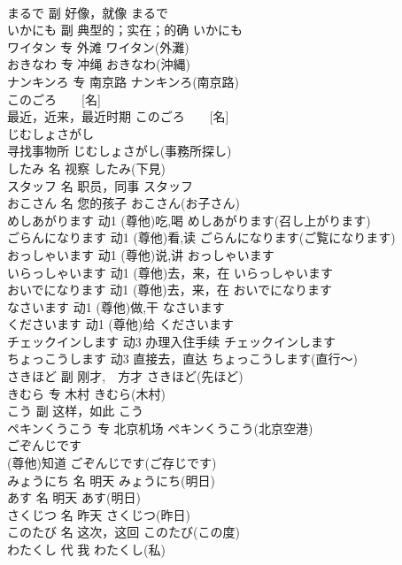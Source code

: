 \documentclass[8pt]{extreport}
\begin{document}
\begin{CJK}{UTF8}{min}
\\	まるで	副	好像，就像	まるで	
\\	いかにも	副	典型的；实在；的确	いかにも	
\\	ワイタン	专	外滩	ワイタン(外灘)	
\\	おきなわ	专	冲绳	おきなわ(沖縄)	
\\	ナンキンろ	专	南京路	ナンキンろ(南京路)	
\\	このごろ　　[名]	
\\	最近，近来，最近时期	このごろ　　[名]	
\\	じむしょさがし	
\\	寻找事物所	じむしょさがし(事務所探し)	
\\	したみ	名	视察	したみ(下見)	
\\	スタッフ	名	职员，同事	スタッフ	
\\	おこさん	名	您的孩子	おこさん(お子さん)	
\\	めしあがります	动1	(尊他)吃,喝	めしあがります(召し上がります)	
\\	ごらんになります	动1	(尊他)看,读	ごらんになります(ご覧になります)	
\\	おっしゃいます	动1	(尊他)说,讲	おっしゃいます	
\\	いらっしゃいます	动1	(尊他)去，来，在	いらっしゃいます	
\\	おいでになります	动1	(尊他)去，来，在	おいでになります	
\\	なさいます	动1	(尊他)做,干	なさいます	
\\	くださいます	动1	(尊他)给	くださいます	
\\	チェックインします	动3	办理入住手续	チェックインします	
\\	ちょっこうします	动3	直接去，直达	ちょっこうします(直行～)	
\\	さきほど	副	刚才,　方才	さきほど(先ほど)	
\\	きむら	专	木村	きむら(木村)	
\\	こう	副	这样，如此	こう	
\\	ペキンくうこう	专	北京机场	ペキンくうこう(北京空港)	
\\	ごぞんじです	
\\	(尊他)知道	ごぞんじです(ご存じです)	
\\	みょうにち	名	明天	みょうにち(明日)	
\\	あす	名	明天	あす(明日)	
\\	さくじつ	名	昨天	さくじつ(昨日)	
\\	このたび	名	这次，这回	このたび(この度)	
\\	わたくし	代	我	わたくし(私)	

\end{CJK}
\end{document}
